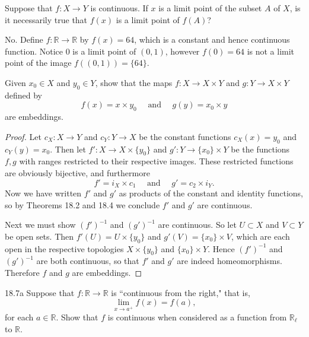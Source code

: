 \documentclass[11pt]{article}
\begin{document}



\begin{ex}{18.2}
  Suppose that $f: X \to Y$ is continuous. If $x$ is a limit point of the subset
  $A$ of $X$, is it necessarily true that $f(x)$ is a limit point of $f(A)$?
\end{ex}

\begin{solution}
  No. Define $f:\mathbb{R} \to \mathbb{R}$ by $f(x) = 64$, which is a constant
  and hence continuous function. Notice $0$ is a limit point of $(0, 1)$,
  however $f(0) = 64$ is not a limit point of the image $f((0, 1)) = \{64 \}$.
\end{solution}

\begin{ex}{18.4}
  Given $x_0 \in X$ and $y_0 \in Y$, show that the maps $f: X \to X \times Y$
  and $g: Y \to X \times Y$ defined by
  \[ f(x) = x \times y_0 \quad \text{ and } \quad g(y) = x_0 \times y \]
  are embeddings.
\end{ex}

\begin{proof}
  Let $c_X: X \to Y$ and $c_Y: Y \to X$ be the constant functions $c_X(x) = y_0$
  and $c_Y(y) = x_0$. Then let $f': X \to X \times \{y_0\}$ and $g': Y \to \{x_0\}
  \times Y$ be the functions $f,g$ with ranges restricted to their respective
  images. These restricted functions are obviously bijective, and furthermore
  \[ f' = i_X \times c_1 \quad \text{ and } \quad g' = c_2 \times i_Y. \]
  Now we have written $f'$ and $g'$ as products of the constant and identity
  functions, so by Theorems 18.2 and 18.4 we conclude $f'$ and $g'$ are
  continuous.

  Next we must show $(f')^{-1}$ and $(g')^{-1}$ are continuous. So let $U
  \subset X$ and $V \subset Y$ be open sets. Then $f'(U) = U \times \{y_0\}$ and
  $g'(V) = \{x_0\} \times V$, which are each open in the respective topologies
  $X \times \{y_0\}$ and $\{x_0\} \times Y$. Hence $(f')^{-1}$ and $(g')^{-1}$
  are both continuous, so that $f'$ and $g'$ are indeed homeomorphisms.
  Therefore $f$ and $g$ are embeddings.
\end{proof}

\begin{ex}{18.7a}
  Suppose that $f:\mathbb{R} \to \mathbb{R}$ is ``continuous from the right,"
  that is,
  \[ \lim_{x \to a^+} f(x) = f(a), \]
  for each $a \in \mathbb{R}$. Show that $f$ is continuous when considered as a
  function from $\mathbb{R}_\ell$ to $\mathbb{R}$.
\end{ex}
\end{document}
